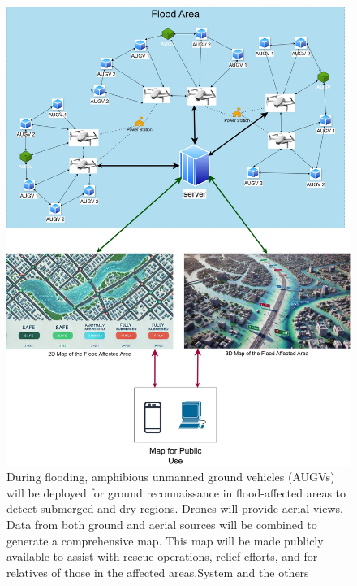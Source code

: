 \documentclass[conference]{IEEEtran}
\begin{document}
\begin{figure}[h]
    \centering
    \includegraphics[width=\linewidth]{flood_time.jpg}
    \caption{During flooding, amphibious unmanned ground vehicles (AUGVs) will be deployed for ground reconnaissance in flood-affected areas to detect submerged and dry regions. Drones will provide aerial views. Data from both ground and aerial sources will be combined to generate a comprehensive map. This map will be made publicly available to assist with rescue operations, relief efforts, and for relatives of those in the affected areas.System and the others }
    \label{fig:gher_freshwater}
\end{figure}

	
	
\end{document}
